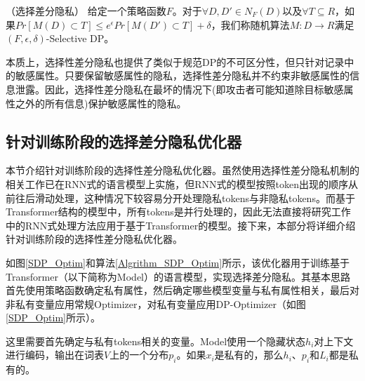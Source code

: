 \begin{definition}{（选择差分隐私\cite{selectivedp}）}
给定一个策略函数$F$。对于$∀D, D'\in N_F (D)$以及$∀T⊆R$，如果$Pr[M(D)\subset T]\leq e^\epsilon Pr[M(D')\subset T]+\delta$，我们称随机算法$M:D\rightarrow R$满足$(F,\epsilon,\delta)$-Selective DP。
\label{SDP}
\end{definition}

本质上，选择性差分隐私也提供了类似于规范DP的不可区分性，但只针对记录中的敏感属性。只要保留敏感属性的隐私，选择性差分隐私并不约束非敏感属性的信息泄露。因此，选择性差分隐私在最坏的情况下(即攻击者可能知道除目标敏感属性之外的所有信息)保护敏感属性的隐私。

\subsection{针对训练阶段的选择差分隐私优化器}



本节介绍针对训练阶段的选择性差分隐私优化器。虽然使用选择性差分隐私机制的相关工作\cite{selectivedp}已在RNN式的语言模型上实施，但RNN式的模型按照token出现的顺序从前往后滑动处理，这种情况下较容易分开处理隐私tokens与非隐私tokens。而基于Transformer结构的模型中，所有tokens是并行处理的，因此无法直接将研究工作\cite{selectivedp}中的RNN式处理方法应用于基于Transformer的模型。接下来，本部分将详细介绍针对训练阶段的选择性差分隐私优化器。


如图\ref{SDP_Optim}和算法\ref{Algrithm_SDP_Optim}所示，该优化器用于训练基于Transformer（以下简称为Model）的语言模型，实现选择差分隐私。其基本思路首先使用策略函数确定私有属性，然后确定哪些模型变量与私有属性相关，最后对非私有变量应用常规Optimizer，对私有变量应用DP-Optimizer（如图\ref{SDP_Optim}所示）。

这里需要首先确定与私有tokens相关的变量。Model使用一个隐藏状态$h_i$对上下文进行编码，输出在词表$V$上的一个分布$p_i$。如果$x_i$是私有的，那么$h_i$、$p_i$和$L_i$都是私有的。

